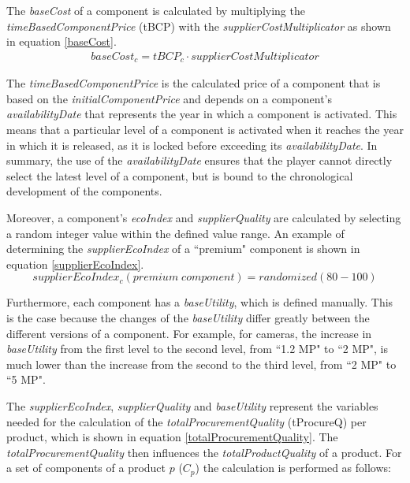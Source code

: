 The \textit{baseCost} of a component is calculated by multiplying the \textit{timeBasedComponentPrice} (\gls{tBCP}) with the \textit{supplierCostMultiplicator} as shown in equation \ref{baseCost}.
\begin{equation}
\label{baseCost}
\begin{aligned}
   baseCost_{c} = tBCP_{c} \cdot supplierCostMultiplicator
\end{aligned}    
\end{equation}

The \textit{timeBasedComponentPrice} is the calculated price of a component that is based on the \textit{initialComponentPrice} and depends on a component's \textit{availabilityDate} that represents the year in which a component is activated. This means that a particular level of a component is activated when it reaches the year in which it is released, as it is locked before exceeding its \textit{availabilityDate}. In summary, the use of the \textit{availabilityDate} ensures that the player cannot directly select the latest level of a component, but is bound to the chronological development of the components.

Moreover, a component's \textit{ecoIndex} and \textit{supplierQuality} are calculated by selecting a random integer value within the defined value range. An example of determining the \textit{supplierEcoIndex} of a ``premium" component is shown in equation \ref{supplierEcoIndex}.
\begin{equation}
\label{supplierEcoIndex}
    supplierEcoIndex_{c}(premium \; component) = randomized(80-100)
\end{equation}

Furthermore, each component has a \textit{baseUtility}, which is defined manually. This is the case because the changes of the \textit{baseUtility} differ greatly between the different versions of a component. For example, for cameras, the increase in \textit{baseUtility} from the first level to the second level, from ``1.2 MP" to ``2 MP", is much lower than the increase from the second to the third level, from ``2 MP" to ``5 MP".

The \textit{supplierEcoIndex}, \textit{supplierQuality} and \textit{baseUtility} represent the variables needed for the calculation of the \textit{totalProcurementQuality} (\gls{tProcureQ}) per product, which is shown in equation \ref{totalProcurementQuality}. The \textit{totalProcurementQuality} then influences the \textit{totalProductQuality} of a product. For a set of components of a product $p$ ($C_p$) the calculation is performed as follows:


